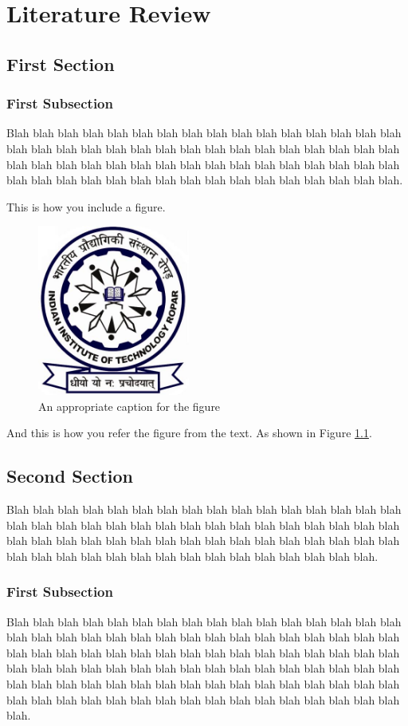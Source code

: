 \chapter{Literature Review}
\section{First Section}
\subsection{First Subsection}
Blah blah blah blah blah blah blah blah blah blah blah blah blah blah blah blah blah blah blah blah blah blah blah blah blah blah blah blah blah blah blah blah blah blah blah blah blah blah blah blah blah blah blah blah blah blah blah blah blah blah blah blah blah blah blah blah blah blah blah blah blah blah blah blah.

This is how you include a figure.

\begin{figure}
\caption{An appropriate caption for the figure}
\label{fig:labelforfigure}
\centering \includegraphics[width=5cm]{Figures/IITRopar-Logo.jpg}
\end{figure}

And this is how you refer the figure from the text. As shown in Figure \ref{fig:labelforfigure}.

\section{Second Section}
Blah blah blah blah blah blah blah blah blah blah blah blah blah blah blah blah blah blah blah blah blah blah blah blah blah blah blah blah blah blah blah blah blah blah blah blah blah blah blah blah blah blah blah blah blah blah blah blah blah blah blah blah blah blah blah blah blah blah blah blah blah blah blah.
\subsection{First Subsection}
Blah blah blah blah blah blah blah blah blah blah blah blah blah blah blah blah blah blah blah blah blah blah blah blah blah blah blah blah blah blah blah blah blah blah blah blah blah blah blah blah blah blah blah blah blah blah blah blah blah blah blah blah blah blah blah blah blah blah blah blah blah blah blah blah blah blah blah blah blah blah blah blah blah blah blah blah blah blah blah blah blah blah blah blah blah blah blah blah blah blah blah blah blah blah blah blah blah.


